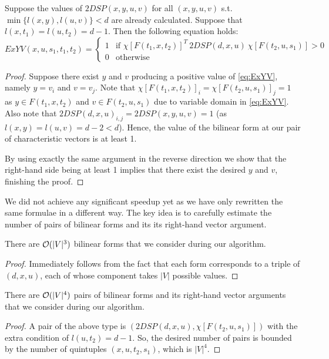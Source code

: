 \begin{proposition}
Suppose the values of $2DSP(x, y, u, v)$ for all $(x, y, u, v)$ s.t. $\min\{l(x, y), l(u, v)\} < d$ are already calculated. Suppose that $l(x, t_1) = l(u, t_2) = d - 1$. Then the following equation holds:
\begin{equation}
\label{eq:ExYVbil}
ExYV(x, u, s_1, t_1, t_2) = \begin{cases}
     1 & \text{if } \chi[F(t_1, x, t_2)]^T~2DSP(d,x,u)~\chi[F(t_2, u, s_1)] > 0 \\
     0 & \text{otherwise}
\end{cases}
\end{equation}
\end{proposition}
\begin{proof}
Suppose there exist $y$ and $v$ producing a positive value of \eqref{eq:ExYV}, namely $y = v_i$ and $v = v_j$. Note that $\chi[F(t_1, x, t_2)]_i = \chi[F(t_2, u, s_1)]_j = 1$ as $y \in F(t_1, x, t_2)$ and $v \in F(t_2, u, s_1)$ due to variable domain in \eqref{eq:ExYV}. Also note that $2DSP(d, x, u)_{i,j} = 2DSP(x, y, u, v) = 1$ (as $l(x, y) = l(u, v) = d - 2 < d$). Hence, the value of the bilinear form at our pair of characteristic vectors is at least 1.

By using exactly the same argument in the reverse direction we show that the right-hand side being at least 1 implies that there exist the desired $y$ and $v$, finishing the proof. 
\end{proof}

We did not achieve any significant speedup yet as we have only rewritten the same formulae in a different way. The key idea is to carefully estimate the number of pairs of bilinear forms and its its right-hand vector argument. 

\begin{proposition}
There are $\mathcal{O}(|V|^3)$ bilinear forms that we consider during our algorithm.
\end{proposition}
\begin{proof}
Immediately follows from the fact that each form corresponds to a triple of $(d, x, u)$, each of whose component takes $|V|$ possible values.
\end{proof}

\begin{proposition}
There are $\mathcal{O}(|V|^4)$ pairs of bilinear forms and its right-hand vector arguments that we consider during our algorithm.
\end{proposition}
\begin{proof}
A pair of the above type is $(2DSP(d, x, u), \chi[F(t_2, u, s_1)])$ with the extra condition of $l(u, t_2) = d - 1$. So, the desired number of pairs is bounded by the number of quintuples $(x, u, t_2, s_1)$, which is $|V|^4$.
\end{proof}

